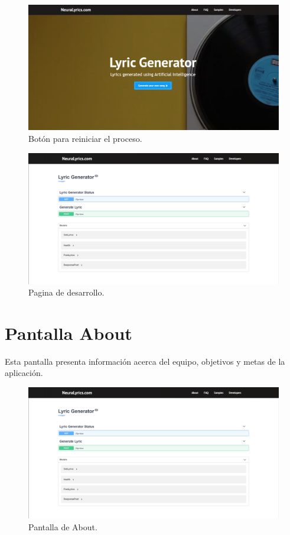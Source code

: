 \documentclass[12pt, a4paper, titlepage]{article}
\begin{document}
\begin{itemize}
		\begin{figure}[H] 
			\includegraphics[width=13.5cm]{./Imagenes/Capturas/pprincipal.jpg}
			\centering \caption{Botón para reiniciar el proceso.}
		\end{figure}
	\end{itemize}

\begin{figure}[H] 
	\includegraphics[width=13.5cm]{./Imagenes/Capturas/pdev.png}
	\centering \caption{Pagina de desarrollo.}
\end{figure}

		\section{Pantalla About}
		Esta pantalla presenta información acerca del equipo, objetivos y metas de la aplicación.
		
		\begin{figure}[H] 
			\includegraphics[width=13.5cm]{./Imagenes/Capturas/pdev.png}
			\centering \caption{Pantalla de About.}
		\end{figure}
	
\end{document}
